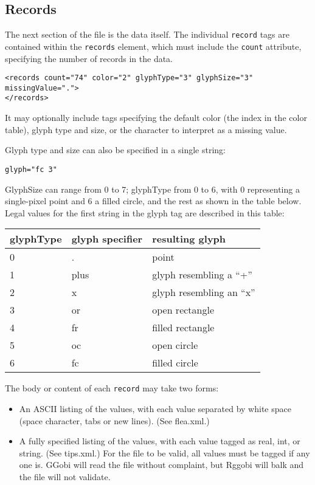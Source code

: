 \documentclass{article}
\begin{document}
\subsection{Records}

The next section of the file is the data itself.  The individual
\texttt{record} tags are contained within the \texttt{records}
element, which must include the \texttt{count} attribute, specifying
the number of records in the data.

\begin{verbatim}
<records count="74" color="2" glyphType="3" glyphSize="3" missingValue=".">
</records>
\end{verbatim}
%
It may optionally include tags specifying the default color (the
index in the color table), glyph type and size, or the character to
interpret as a missing value.

Glyph type and size can also be specified in a single string:
\begin{verbatim}
glyph="fc 3"
\end{verbatim}
GlyphSize can range from 0 to 7; glyphType from 0 to 6, with 0
representing a single-pixel point and 6 a filled circle, and
the rest as shown in the table below.  Legal values
for the first string in the glyph tag are described in this table:

\vspace{1em}

\begin{tabular}{l|l|l}
glyphType & glyph specifier & resulting glyph \\
\hline
0 & .    & point \\
1 & plus & glyph resembling a ``+'' \\
2 & x    & glyph resembling an ``x'' \\
3 & or   & open rectangle \\
4 & fr   & filled rectangle \\
5 & oc   & open circle \\
6 & fc   & filled circle
\end{tabular}

\vspace{1em}

The body or content of each \texttt{record} may take two forms:
\begin{itemize} \itemsep 0em
\item An ASCII listing of the values, with each value
separated by white space (space character, tabs or new lines).
(See flea.xml.)
\item A fully specified listing of the values, with each value tagged
as real, int, or string.  (See tips.xml.)  For the file to be
valid, all values must be tagged if any one is.  GGobi will read the
file without complaint, but Rggobi will balk and the file will not
validate.
\end{itemize}
\end{document}
